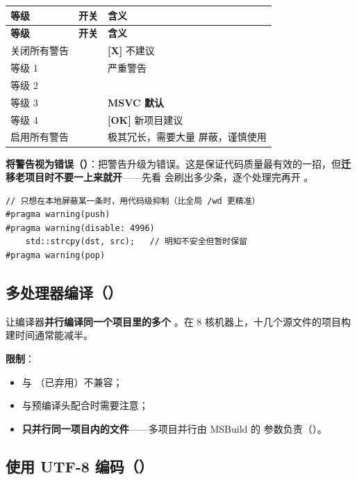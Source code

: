 \begin{longtable}{L{3.6cm}L{2.6cm}L{8.2cm}}
\toprule
\textbf{等级} & \textbf{开关} & \textbf{含义} \\
\midrule
\endfirsthead
\toprule
\textbf{等级} & \textbf{开关} & \textbf{含义} \\
\midrule
\endhead
\bottomrule
\endlastfoot
关闭所有警告 &  & \textbf{[X]} 不建议 \\
等级 1 &  & 严重警告 \\
等级 2 &  & \\
等级 3 &  & \textbf{MSVC 默认} \\
等级 4 &  & \textbf{[OK]} 新项目建议 \\
启用所有警告 &  & 极其冗长，需要大量  屏蔽，谨慎使用 \\
\end{longtable}

\textbf{将警告视为错误（）}：把警告升级为错误。这是保证代码质量最有效的一招，但\textbf{迁移老项目时不要一上来就开}——先看  会刷出多少条，逐个处理完再开 。

\begin{lstlisting}[style=cppstyle]
// 只想在本地屏蔽某一条时，用代码级抑制（比全局 /wd 更精准）
#pragma warning(push)
#pragma warning(disable: 4996)
    std::strcpy(dst, src);   // 明知不安全但暂时保留
#pragma warning(pop)
\end{lstlisting}

\subsection{多处理器编译（）}

 让编译器\textbf{并行编译同一个项目里的多个 }。在 8 核机器上，十几个源文件的项目构建时间通常能减半。

\textbf{限制}：

\begin{itemize}
  \item 与 （已弃用）不兼容；
  \item 与预编译头配合时需要注意；
  \item \textbf{只并行同一项目内的文件}——多项目并行由 MSBuild 的  参数负责（）。
\end{itemize}

\subsection{使用 UTF-8 编码（）}

